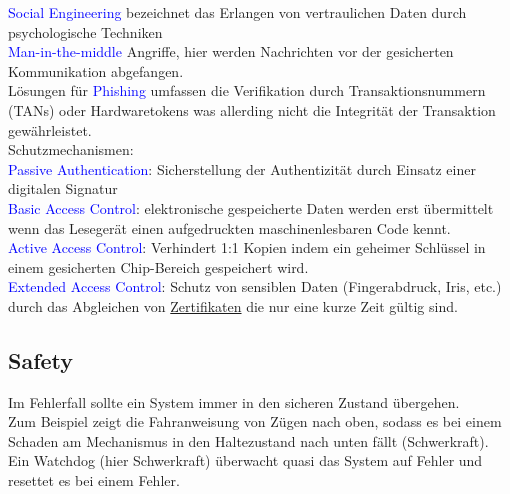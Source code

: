 \documentclass[a4paper,12pt]{article}
\newcommand{\blue}[1]{\textcolor{blue}{#1}}
\begin{document}
\blue{Social Engineering} bezeichnet das Erlangen von vertraulichen Daten durch psychologische Techniken\\
\blue{Man-in-the-middle} Angriffe, hier werden Nachrichten vor der gesicherten Kommunikation abgefangen.\\
Lösungen für \blue{Phishing} umfassen die Verifikation durch Transaktionsnummern (TANs) oder Hardwaretokens was allerding nicht die Integrität der Transaktion gewährleistet.\\
Schutzmechanismen:\\
\blue{Passive Authentication}: Sicherstellung der Authentizität durch Einsatz einer digitalen Signatur\\
\blue{Basic Access Control}: elektronische gespeicherte Daten werden erst übermittelt wenn das Lesegerät einen aufgedruckten maschinenlesbaren Code kennt.\\
\blue{Active Access Control}: Verhindert 1:1 Kopien indem ein geheimer Schlüssel in einem gesicherten Chip-Bereich gespeichert wird.\\
\blue{Extended Access Control}: Schutz von sensiblen Daten (Fingerabdruck, Iris, etc.) durch das Abgleichen von \href{https://en.wikipedia.org/wiki/Extended_Access_Control}{Zertifikaten} die nur eine kurze Zeit gültig sind.

\subsection{Safety}
Im Fehlerfall sollte ein System immer in den sicheren Zustand übergehen.\\
Zum Beispiel zeigt die Fahranweisung von Zügen nach oben, sodass es bei einem Schaden am Mechanismus in den Haltezustand nach unten fällt (Schwerkraft). Ein Watchdog (hier Schwerkraft) überwacht quasi das System auf Fehler und resettet es bei einem Fehler.
\end{document}
